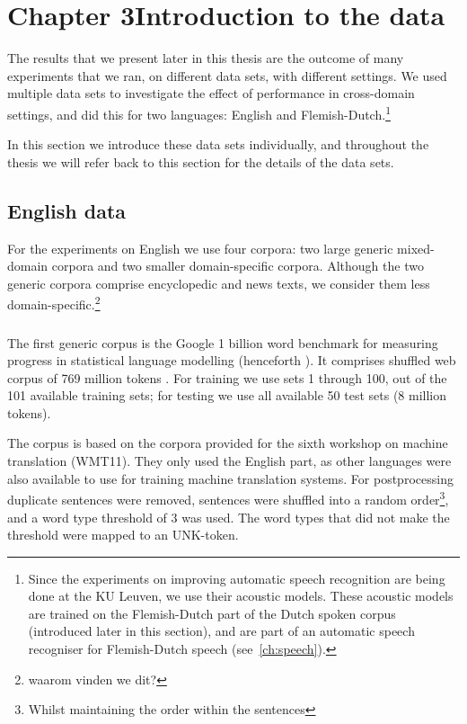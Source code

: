 \chapter{Chapter 3\newline Introduction to the data}\label{chap:data}
The results that we present later in this thesis are the outcome of many experiments that we ran, on different data sets, with different settings. We used multiple data sets to investigate the effect of performance in cross-domain settings, and did this for two languages: English and Flemish-Dutch.\footnote{Since the experiments on improving automatic speech recognition are being done at the KU Leuven, we use their acoustic models. These acoustic models are trained on the Flemish-Dutch part of the Dutch spoken corpus (introduced later in this section), and are part of an automatic speech recogniser for Flemish-Dutch speech (see~\cref{ch:speech}).} 

In this section we introduce these data sets individually, and throughout the thesis we will refer back to this section for the details of the data sets.

\section{English data}
For the experiments on English we use four corpora: two large generic mixed-domain corpora and two smaller domain-specific corpora. Although the two generic corpora comprise encyclopedic and news texts, we consider them less domain-specific.\footnote{waarom vinden we dit?}
  
  \subsection{\obw}
  
  The first generic corpus is the Google 1 billion word benchmark for measuring progress in statistical language modelling (henceforth \obw). It comprises shuffled web corpus of 769 million tokens \cite{chelba2013one}. For training we use sets 1 through 100, out of the 101 available training sets; for testing we use all available 50 test sets (8 million tokens).
  
  The corpus is based on the corpora provided for the sixth workshop on machine translation (WMT11). They only used the English part, as other languages were also available to use for training machine translation systems. For postprocessing duplicate sentences were removed, sentences were shuffled into a random order\footnote{Whilst maintaining the order within the sentences}, and a word type threshold of 3 was used. The word types that did not make the threshold were mapped to an UNK-token.
  
